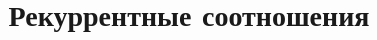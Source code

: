 \documentclass[14pt]{article}
\begin{document}
\title{Рекуррентные соотношения}

\maketitle


\end{document}
